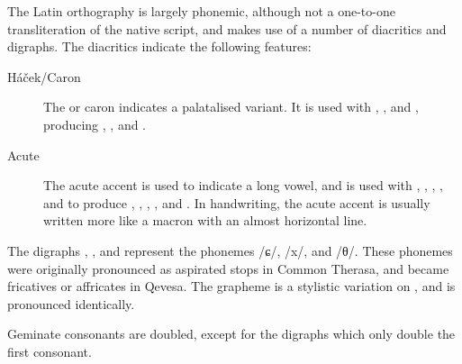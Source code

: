 \documentclass[grammar]{subfiles}
\begin{document}
The Latin orthography is largely phonemic, although not a one-to-one
transliteration of the native script, and makes use of a number of diacritics
and digraphs.  The diacritics indicate the following features:

\begin{description}
  \item[Háček/Caron] The  or caron indicates a palatalised
    variant.  It is used with , ,  and
    , producing , ,  and
    .
  \item[Acute] The acute accent is used to indicate a long vowel, and is used
    with , , , ,  and
     to produce , , , ,
     and .  In handwriting, the acute accent is usually
    written more like a macron with an almost horizontal line. 
\end{description}

The digraphs , , and  represent the
phonemes /ɕ/, /x/, and /θ/.  These phonemes were originally pronounced as
aspirated stops in Common Therasa, and became fricatives or affricates in
Qevesa.  The grapheme  is a stylistic variation on , and
is pronounced identically.

Geminate consonants are doubled, except for the digraphs which only double the
first consonant.  
\end{document}

